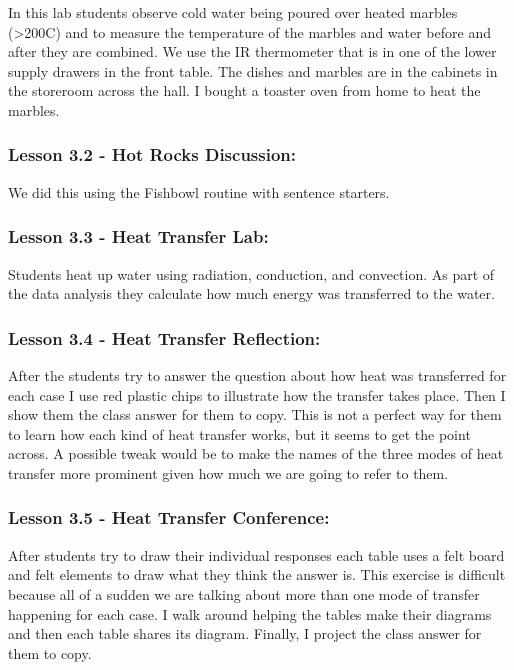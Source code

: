\documentclass[12pt]{article}
\begin{document}
In this lab students observe cold water being poured
over heated marbles (>200C) and to measure the temperature of the marbles and water
before and after they are combined. We use the IR thermometer that is in one of the
lower supply drawers in the front table. The dishes and marbles are in the cabinets in the
storeroom across the hall. I bought a toaster oven from home to heat the marbles.


\subsubsection{Lesson 3.2 - Hot Rocks Discussion:}
\label{sec:org4e535f4}

We did this using the Fishbowl routine with sentence starters.


\subsubsection{Lesson 3.3 - Heat Transfer Lab:}
\label{sec:org888ad4e}

Students heat up water using radiation, conduction, and
convection. As part of the data analysis they calculate how much energy was transferred
to the water.


\subsubsection{Lesson 3.4 - Heat Transfer Reflection:}
\label{sec:orgd3fabc9}

After the students try to answer the question about how heat was transferred for each case I use red plastic chips to illustrate how the
transfer takes place. Then I show them the class answer for them to copy. This is not a
perfect way for them to learn how each kind of heat transfer works, but it seems to get
the point across. A possible tweak would be to make the names of the three modes of
heat transfer more prominent given how much we are going to refer to them.


\subsubsection{Lesson 3.5 - Heat Transfer Conference:}
\label{sec:orgdcb056e}

After students try to draw their individual responses each table uses a felt board and felt elements to draw what they think the
answer is. This exercise is difficult because all of a sudden we are talking about more
than one mode of transfer happening for each case. I walk around helping the tables
make their diagrams and then each table shares its diagram. Finally, I project the class
answer for them to copy.
\end{document}
